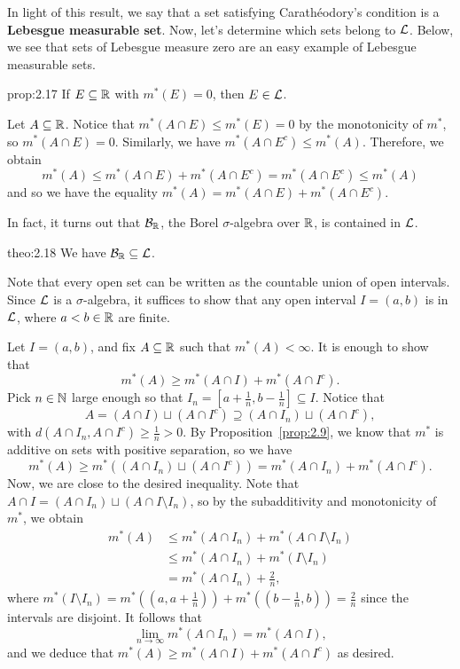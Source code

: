 In light of this result, we say that a set satisfying Carathéodory's condition 
is a {\bf Lebesgue measurable set}. Now, let's determine which sets belong 
to ${\cal L}$. Below, we see that sets of Lebesgue measure zero are an 
easy example of Lebesgue measurable sets. 

\begin{prop}{prop:2.17}
    If $E \subseteq \mathbb{R}$ with $m^*(E) = 0$, then $E \in {\cal L}$.     
\end{prop}
\begin{pf}
    Let $A \subseteq \mathbb{R}$. Notice that $m^*(A \cap E) \leq m^*(E) = 0$
    by the monotonicity of $m^*$, so $m^*(A \cap E) = 0$. 
    Similarly, we have $m^*(A \cap E^c) \leq m^*(A)$. Therefore, we obtain  
    \[ m^*(A) \leq m^*(A \cap E) + m^*(A \cap E^c) = m^*(A \cap E^c) 
    \leq m^*(A) \] 
    and so we have the equality $m^*(A) = m^*(A \cap E) + m^*(A \cap E^c)$. 
\end{pf}

In fact, it turns out that ${\cal B}_{\mathbb{R}}$, the Borel $\sigma$-algebra 
over $\mathbb{R}$, is contained in ${\cal L}$. 

\begin{theo}{theo:2.18}
    We have ${\cal B}_{\mathbb{R}} \subseteq {\cal L}$. 
\end{theo}
\begin{pf}
    Note that every open set can be written as the countable union of open 
    intervals. Since ${\cal L}$ is a $\sigma$-algebra, it suffices to 
    show that any open interval $I = (a, b)$ is in ${\cal L}$, where 
    $a < b \in \mathbb{R}$ are finite. 

    Let $I = (a, b)$, and fix $A \subseteq \mathbb{R}$ such that $m^*(A) < \infty$. 
    It is enough to show that 
    \[ m^*(A) \geq m^*(A \cap I) + m^*(A \cap I^c). \] 
    Pick $n \in \mathbb{N}$ large enough so that $I_n = [a + \frac1n, b - \frac1n]
    \subseteq I$. Notice that 
    \[ A = (A \cap I) \sqcup (A \cap I^c) \supseteq 
    (A \cap I_n) \sqcup (A \cap I^c), \] 
    with $d(A \cap I_n, A \cap I^c) \geq \frac1n > 0$. By Proposition~\ref{prop:2.9},
    we know that $m^*$ is additive on sets with positive separation, so we have 
    \[ m^*(A) \geq m^*((A \cap I_n) \sqcup (A \cap I^c)) 
    = m^*(A \cap I_n) + m^*(A \cap I^c). \] 
    Now, we are close to the desired inequality. Note that $A \cap I = 
    (A \cap I_n) \sqcup (A \cap I \setminus I_n)$, so by the subadditivity
    and monotonicity of $m^*$, we obtain 
    \begin{align*}
        m^*(A) &\leq m^*(A \cap I_n) + m^*(A \cap I \setminus I_n) \\ 
        &\leq m^*(A \cap I_n) + m^*(I \setminus I_n) \\ 
        &= m^*(A \cap I_n) + \tfrac2n, 
    \end{align*}
    where $m^*(I \setminus I_n) = m^*((a, a+\frac1n)) + m^*((b-\frac1n, b)) 
    = \frac2n$ since the intervals are disjoint. It follows that 
    \[ \lim_{n\to\infty} m^*(A \cap I_n) = m^*(A \cap I), \] 
    and we deduce that $m^*(A) \geq m^*(A \cap I) + m^*(A \cap I^c)$ 
    as desired. 
\end{pf}

